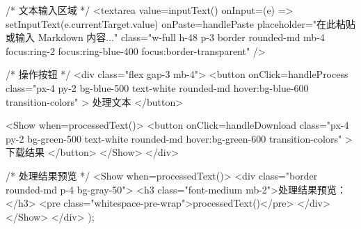 {      {/* 文本输入区域 */}
      <textarea
        value={inputText()}
        onInput={(e) => setInputText(e.currentTarget.value)}
        onPaste={handlePaste}
        placeholder="在此粘贴或输入 Markdown 内容..."
        class="w-full h-48 p-3 border rounded-md mb-4
               focus:ring-2 focus:ring-blue-400 focus:border-transparent"
      />

      {/* 操作按钮 */}
      <div class="flex gap-3 mb-4">
        <button
          onClick={handleProcess}
          class="px-4 py-2 bg-blue-500 text-white rounded-md
                 hover:bg-blue-600 transition-colors"
        >
          处理文本
        </button>
        
        <Show when={processedText()}>
          <button
            onClick={handleDownload}
            class="px-4 py-2 bg-green-500 text-white rounded-md
                   hover:bg-green-600 transition-colors"
          >
            下载结果
          </button>
        </Show>
      </div>

      {/* 处理结果预览 */}
      <Show when={processedText()}>
        <div class="border rounded-md p-4 bg-gray-50">
          <h3 class="font-medium mb-2">处理结果预览：</h3>
          <pre class="whitespace-pre-wrap">{processedText()}</pre>
        </div>
      </Show>
    </div>
  );
}
